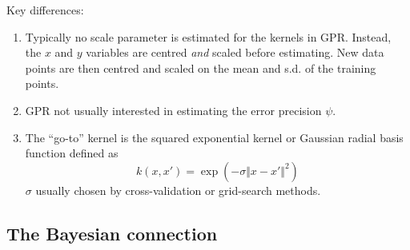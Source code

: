 Key differences:
\begin{enumerate}
  \item Typically no scale parameter is estimated for the kernels in GPR. Instead, the $x$ and $y$ variables are centred \emph{and} scaled before estimating. New data points are then centred and scaled on the mean and s.d. of the training points.
  \item GPR not usually interested in estimating the error precision $\psi$.
  \item The ``go-to'' kernel is the squared exponential kernel or Gaussian radial basis function defined as
  \[
    k(x,x') = \exp(-\sigma\Vert x-x' \Vert^2)
  \]
  $\sigma$ usually chosen by cross-validation or grid-search methods.
\end{enumerate}


\subsection{The Bayesian connection}

